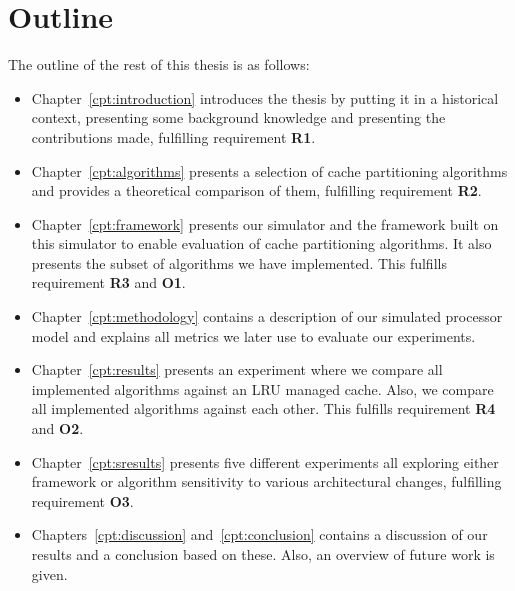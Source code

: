 \section{Outline}

The outline of the rest of this thesis is as follows:

\begin{itemize}
  \item Chapter~\ref{cpt:introduction} introduces the thesis by putting it in a historical context, presenting some background knowledge and presenting the contributions made, fulfilling requirement \textbf{R1}.

  \item Chapter~\ref{cpt:algorithms} presents a selection of cache partitioning algorithms and provides a theoretical comparison of them, fulfilling requirement \textbf{R2}.

  \item Chapter~\ref{cpt:framework} presents our simulator and the framework built on this simulator to enable evaluation of cache partitioning algorithms. It also presents the subset of algorithms we have implemented. This fulfills requirement \textbf{R3} and \textbf{O1}.

  \item Chapter~\ref{cpt:methodology} contains a description of our simulated processor model and explains all metrics we later use to evaluate our experiments.

  \item Chapter~\ref{cpt:results} presents an experiment where we compare all implemented algorithms against an LRU managed cache. Also, we compare all implemented algorithms against each other. This fulfills requirement \textbf{R4} and \textbf{O2}.

  \item Chapter~\ref{cpt:sresults} presents five different experiments all exploring either framework or algorithm sensitivity to various architectural changes, fulfilling requirement \textbf{O3}.

  \item Chapters~\ref{cpt:discussion} and~\ref{cpt:conclusion} contains a discussion of our results and a conclusion based on these. Also, an overview of future work is given.

\end{itemize}